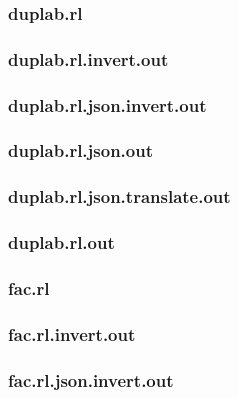 \subsubsection{duplab.rl}
\label{app:duplab_rl}

\subsubsection{duplab.rl.invert.out}
\label{app:duplab_rl.invert.out}

\subsubsection{duplab.rl.json.invert.out}
\label{app:duplab_rl.json.invert.out}

\subsubsection{duplab.rl.json.out}
\label{app:duplab_rl.json.out}

\subsubsection{duplab.rl.json.translate.out}
\label{app:duplab_rl.json.translate.out}

\subsubsection{duplab.rl.out}
\label{app:duplab_rl.out}

\subsubsection{fac.rl}
\label{app:fac_rl}

\subsubsection{fac.rl.invert.out}
\label{app:fac_rl.invert.out}

\subsubsection{fac.rl.json.invert.out}
\label{app:fac_rl.json.invert.out}

